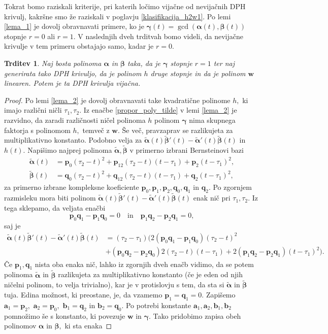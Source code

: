 \documentclass[12pt,a4paper,twoside]{article}
\theoremstyle{definition} %
\theoremstyle{plain} %
\newtheorem{trditev}[definicija]{Trditev}
\theoremstyle{primerstyle}
\numberwithin{equation}{section}  %
\newcommand{\aV}{\mathbf{a}}
\newcommand{\bV}{\mathbf{b}}
\newcommand{\pV}{\mathbf{p}}
\newcommand{\qV}{\mathbf{q}}
\newcommand{\wV}{\mathbf{w}}
\newcommand{\balpha}{\boldsymbol \alpha}
\newcommand{\bbeta}{\boldsymbol \beta}
\newcommand{\bgamma}{\boldsymbol \gamma}
\newcommand{\btalpha}{\tilde{\boldsymbol \alpha}}
\newcommand{\btbeta}{\tilde{\boldsymbol \beta}}
\begin{document}
Tokrat bomo raziskali kriterije, pri katerih ločimo vijačne od nevijačnih DPH krivulj, kakršne smo že raziskali v poglavju \ref{klasifikacija_h2w1}. Po lemi \ref{lema_1} je dovolj obravnavati primere, ko je $\bgamma(t)=\gcd(\balpha(t),\bbeta(t))$ stopnje $r=0$ ali $r=1.$ V naslednjih dveh trditvah bomo videli, da nevijačne krivulje v tem primeru obstajajo samo, kadar je $r=0.$
\begin{trditev}
	\label{locevanje_h2w1_trditev1}
	Naj bosta polinoma $\balpha$ in $\bbeta$ taka, da je $\bgamma$ stopnje $r=1$ ter naj generirata tako DPH krivuljo, da je polinom $h$ druge stopnje in da je polinom $\wV$ linearen. Potem je ta DPH krivulja vijačna.
\end{trditev}
\begin{proof}
	Po lemi \ref{lema_2} je dovolj obravnavati take kvadratične polinome $h,$ ki imajo različni ničli $\tau_1,\tau_2.$ Iz enačbe \eqref{propor_poly_tilde} v lemi \ref{lema_2} je razvidno, da zaradi različnosti ničel polinoma $h$ polinom $\bgamma$ nima skupnega faktorja s polinomom $h,$ temveč z $\wV.$ Še več, pravzaprav se razlikujeta za multiplikativno konstanto. Podobno velja za $\btalpha(t)\btbeta'(t)-\btalpha'(t)\btbeta(t)$ in $h(t).$ Napišimo najprej polinoma $\btalpha,\btbeta$ v primerno izbrani Bernsteinovi bazi
	\begin{align*}
		\btalpha(t)&=\pV_0(\tau_2-t)^2+\pV_12(\tau_2-t)(t-\tau_1)+\pV_2(t-\tau_1)^2,\\
		\btbeta(t)&=\qV_0(\tau_2-t)^2+\qV_12(\tau_2-t)(t-\tau_1)+\qV_2(t-\tau_1)^2,
	\end{align*}
	za primerno izbrane kompleksne koeficiente $\pV_0,\pV_1,\pV_2,\qV_0,\qV_1$ in $\qV_2.$ Po zgornjem razmisleku mora biti polinom $\btalpha(t)\btbeta'(t)-\btalpha'(t)\btbeta(t)$ enak nič pri $\tau_1,\tau_2.$ Iz tega sklepamo, da veljata enačbi
	\begin{equation*}
		\pV_0\qV_1-\pV_1\qV_0=0\quad\text{in}\quad\pV_1\qV_2-\pV_2\qV_1=0,
	\end{equation*}
	saj je
	\begin{align*}
		\btalpha(t)\btbeta'(t)-\btalpha'(t)\btbeta(t)&=(\tau_2-\tau_1)\big(2(\pV_0\qV_1-\pV_1\qV_0)(\tau_2-t)^2\\
		&+(\pV_0\qV_2-\pV_2\qV_0)2(\tau_2-t)(t-\tau_1)
		+2(\pV_1\qV_2-\pV_2\qV_1)(t-\tau_1)^2\big).
	\end{align*}
	Če $\pV_1,\qV_1$ nista oba enaka nič, lahko iz zgornjih dveh enačb vidimo, da se potem polinoma $\btalpha$ in $\btbeta$ razlikujeta za multiplikativno konstanto (če je eden od njih ničelni polinom, to velja trivialno), kar je v protislovju s tem, da sta si $\btalpha$ in $\btbeta$ tuja. Edina možnost, ki preostane, je, da vzamemo $\pV_1=\qV_1=0.$ Zapišemo $\aV_1=\pV_2,$ $\aV_2=\pV_0,$ $\bV_1=\qV_2$ in $\bV_2=\qV_0.$ Po potrebi konstante $\aV_1,\aV_2,\bV_1,\bV_2$ pomnožimo še s konstanto, ki povezuje $\wV$ in $\bgamma$. Tako pridobimo zapisa obeh polinomov $\balpha$ in $\bbeta,$ ki sta enaka

\end{proof}
\end{document}
